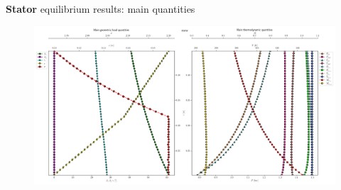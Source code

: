 	\begin{frame}{\textbf{Stator} equilibrium results: main quantities}
		\begin{figure}
			\centering
			\includegraphics[width=1\textwidth]{figures/statorThermo.png}
		\end{figure}
	\end{frame}
